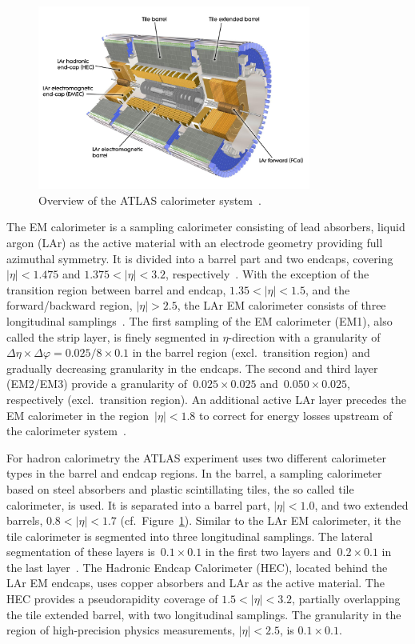 \begin{figure}[htb]
  \centering
  \includegraphics[width=0.8\textwidth]{./figures/atlas/calorimeter.jpg}
  \caption[Overview of the ATLAS calorimeter system]{Overview of the ATLAS
    calorimeter system~\cite{calo_fig}.}
  \label{fig:atlas_calo}
\end{figure}

The EM calorimeter is a sampling calorimeter consisting of lead absorbers,
liquid argon (LAr) as the active material with an electrode geometry providing
full azimuthal symmetry. It is divided into a barrel part and two endcaps,
covering~$|\eta| < 1.475$ and $1.375 < |\eta| < 3.2$,
respectively~\cite{atlas_detector}. With the exception of the transition region
between barrel and endcap, $1.35 < |\eta| < 1.5$, and the forward/backward
region, $|\eta| > 2.5$, the LAr EM calorimeter consists of three longitudinal
samplings~\cite{atlas_detector}. The first sampling of the EM calorimeter (EM1),
also called the strip layer, is finely segmented in $\eta$-direction with a
granularity of~$\Delta\eta \times \Delta\varphi = 0.025/8 \times 0.1$ in the
barrel region (excl.\ transition region) and gradually decreasing granularity in
the endcaps. The second and third layer (EM2/EM3) provide a granularity
of~$0.025 \times 0.025$ and~$0.050 \times 0.025$, respectively (excl.\
transition region). An additional active LAr layer precedes the EM calorimeter
in the region~$|\eta| < 1.8$ to correct for energy losses upstream of the
calorimeter system~\cite{atlas_detector}.

For hadron calorimetry the ATLAS experiment uses two different calorimeter types
in the barrel and endcap regions. In the barrel, a sampling calorimeter based on
steel absorbers and plastic scintillating tiles, the so called tile calorimeter,
is used. It is separated into a barrel part, $|\eta| < 1.0$, and two extended
barrels, $0.8 < |\eta| < 1.7$ (cf.\ Figure~\ref{fig:atlas_calo}). Similar to the
LAr EM calorimeter, it the tile calorimeter is segmented into three longitudinal
samplings. The lateral segmentation of these layers is~$0.1 \times 0.1$ in the
first two layers and~$0.2 \times 0.1$ in the last layer~\cite{atlas_detector}.
The Hadronic Endcap Calorimeter (HEC), located behind the LAr EM endcaps, uses
copper absorbers and LAr as the active material. The HEC provides a
pseudorapidity coverage of $1.5 < |\eta| < 3.2$, partially overlapping the tile
extended barrel, with two longitudinal samplings. The granularity in the region
of high-precision physics measurements, $|\eta| < 2.5$, is $0.1 \times 0.1$.

